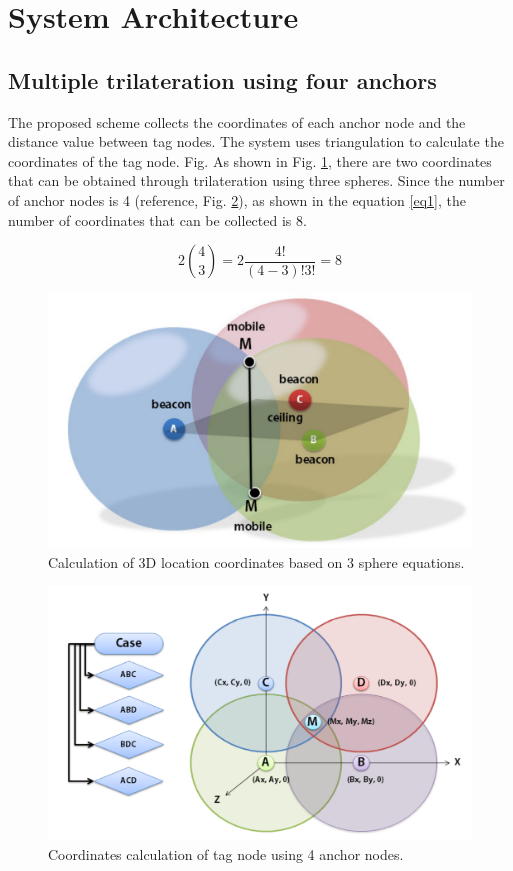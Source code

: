 \documentclass[conference]{IEEEtran}
\begin{document}
\section{System Architecture}

\subsection{Multiple trilateration using four anchors}

The proposed scheme collects the coordinates of each anchor node and the distance value between tag nodes. The system uses triangulation to calculate the coordinates of the tag node. Fig. As shown in Fig. \ref{fig1}, there are two coordinates that can be obtained through trilateration using three spheres. Since the number of anchor nodes is 4 (reference, Fig. \ref{fig2}), as shown in the equation \ref{eq1}, the number of coordinates that can be collected is 8.

\begin{equation}
    2\binom{4}{3} = 2\frac{4!}{(4-3)!3!}=8\label{eq1}
\end{equation}

\begin{figure}[htbp]
    \centerline{\includegraphics[width=0.8\columnwidth]{fig2.png}}
    \caption{Calculation of 3D location coordinates based on 3 sphere equations.}
    \label{fig1}
\end{figure}

\begin{figure}[htbp]
    \centerline{\includegraphics[width=0.8\columnwidth]{fig1.png}}
    \caption{Coordinates calculation of tag node using 4 anchor nodes.}
    \label{fig2}
\end{figure}
\end{document}
